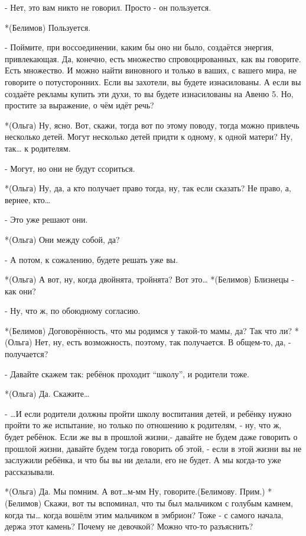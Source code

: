 - Нет, это вам никто не говорил. Просто - он пользуется.

*(Белимов) Пользуется.

- Поймите, при воссоединении, каким бы оно ни было, создаётся энергия, привлекающая. Да, конечно, есть множество спровоцированных, как вы говорите. Есть множество. И можно найти виновного и только в ваших, с вашего мира, не говорите о потусторонних. Если вы захотели, вы будете изнасилованы. А если вы создаёте рекламы купить эти духи, то вы будете изнасилованы на Авеню 5.  Но, простите за выражение, о чём идёт речь?

*(Ольга) Ну, ясно. Вот, скажи, тогда вот по этому поводу, тогда можно привлечь несколько детей. Могут несколько детей придти к одному, к одной матери? Ну, так… к родителям.

- Могут, но они не будут ссориться.

*(Ольга) Ну, да, а кто получает право тогда, ну, так если сказать? Не право, а, вернее, кто…

- Это уже решают они.

*(Ольга) Они между собой, да?

- А потом, к сожалению, будете решать уже вы.

*(Ольга) А вот, ну, когда двойнята, тройнята? Вот это…
*(Белимов) Близнецы - как они?

- Ну, что ж, по обоюдному согласию.

*(Белимов) Договорённость, что мы родимся у такой-то мамы, да? Так что ли?
*(Ольга) Нет, ну, есть возможность, поэтому, так получается. В общем-то, да, - получается?

- Давайте скажем так: ребёнок проходит “школу”, и родители тоже.

*(Ольга) Да. Скажите…

- …И если родители должны пройти школу воспитания детей, и ребёнку нужно пройти то же испытание, но только по отношению к родителям, -  ну, что ж, будет ребёнок. Если же вы в прошлой жизни,- давайте не будем даже говорить о прошлой жизни, давайте будем тогда говорить об этой, - если в этой жизни вы не заслужили ребёнка, и что бы вы ни делали, его не будет. А мы когда-то уже рассказывали.

*(Ольга) Да. Мы помним. А вот…м-мм Ну, говорите.(Белимову. Прим.)
*(Белимов) Скажи, вот ты вспоминал, что ты был мальчиком с голубым камнем, когда ты… когда вошёлм  этим мальчиком в эмбрион? Тоже - с самого начала, держа этот камень? Почему не девочкой? Можно что-то разъяснить?

